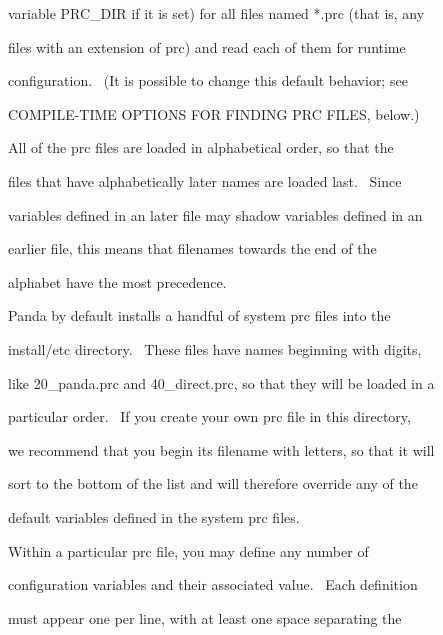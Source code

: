 \documentclass[a4paper]{article}
\begin{document}
{\color{black}
variable PRC\_DIR if it is set) for all files named *.prc (that is, any}

{\color{black}
files with an extension of {\textquotedbl}prc{\textquotedbl}) and read each of them for runtime}

{\color{black}
configuration. \ (It is possible to change this default behavior; see}

{\color{black}
COMPILE-TIME OPTIONS FOR FINDING PRC FILES, below.)}


\bigskip

{\color{black}
All of the prc files are loaded in alphabetical order, so that the}

{\color{black}
files that have alphabetically later names are loaded last. \ Since}

{\color{black}
variables defined in an later file may shadow variables defined in an}

{\color{black}
earlier file, this means that filenames towards the end of the}

{\color{black}
alphabet have the most precedence.}


\bigskip

{\color{black}
Panda by default installs a handful of system prc files into the}

{\color{black}
install/etc directory. \ These files have names beginning with digits,}

{\color{black}
like 20\_panda.prc and 40\_direct.prc, so that they will be loaded in a}

{\color{black}
particular order. \ If you create your own prc file in this directory,}

{\color{black}
we recommend that you begin its filename with letters, so that it will}

{\color{black}
sort to the bottom of the list and will therefore override any of the}

{\color{black}
default variables defined in the system prc files.}


\bigskip


\bigskip

{\color{black}
Within a particular prc file, you may define any number of}

{\color{black}
configuration variables and their associated value. \ Each definition}

{\color{black}
must appear one per line, with at least one space separating the}

\end{document}
